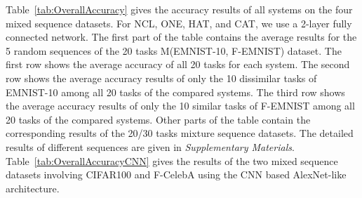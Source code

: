 \documentclass{article}
\begin{document}
\begin{table}[]

\centering
\vspace{-3mm}

\caption{Effect of forward and backward knowledge transfer in CAT. }
\vspace{-4mm}
\label{tab:KnowledgeTransfer}

\end{table}






















Table~\ref{tab:OverallAccuracy} gives the accuracy results of all systems on the four mixed sequence datasets. {\color{black} For NCL, ONE, HAT, and CAT, we use a 2-layer fully connected network.} The first part of the table contains the average results for the 5 random sequences of the 20 tasks M(EMNIST-10, F-EMNIST) dataset. The first row shows the average accuracy of all 20 tasks for each system. The second row shows the average accuracy results of only the 10 dissimilar tasks of EMNIST-10 among all 20 tasks of the compared systems. The third row shows the average accuracy results of only the 10 similar tasks of F-EMNIST among all 20 tasks of the compared systems. 
Other parts of the table contain the corresponding results of the 20/30 tasks mixture sequence datasets. The detailed results of different sequences are given in \textit{Supplementary Materials}. {\color{black}Table~\ref{tab:OverallAccuracyCNN} gives the results of the two mixed  sequence datasets involving CIFAR100 and F-CelebA using the CNN based AlexNet-like architecture.} 
\end{document}

